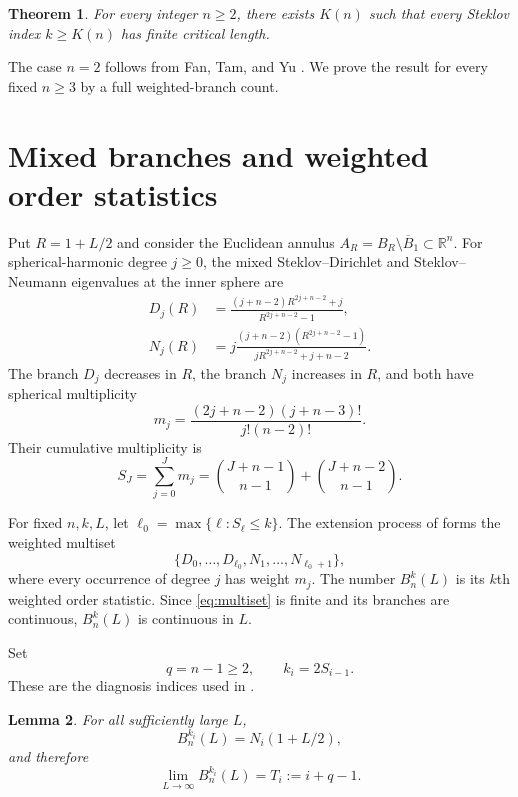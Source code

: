 \documentclass[11pt]{article}
\newtheorem{theorem}{Theorem}
\newtheorem{lemma}[theorem]{Lemma}
\theoremstyle{remark}
\begin{document}
\begin{theorem}\label{thm:main}
For every integer $n\ge2$, there exists $K(n)$ such that every Steklov
index $k\ge K(n)$ has finite critical length.
\end{theorem}

The case $n=2$ follows from Fan, Tam, and Yu \cite{FanTamYu}.  We prove the
result for every fixed $n\ge3$ by a full weighted-branch count.

\section{Mixed branches and weighted order statistics}

Put $R=1+L/2$ and consider the Euclidean annulus
$A_R=B_R\setminus\overline B_1\subset\mathbb R^n$.  For spherical-harmonic
degree $j\ge0$, the mixed Steklov--Dirichlet and Steklov--Neumann eigenvalues
at the inner sphere are
\begin{align}
 D_j(R)&=
 \frac{(j+n-2)R^{2j+n-2}+j}{R^{2j+n-2}-1},\label{eq:D}\\
 N_j(R)&=
 j\frac{(j+n-2)(R^{2j+n-2}-1)}
 {jR^{2j+n-2}+j+n-2}.\label{eq:N}
\end{align}
The branch $D_j$ decreases in $R$, the branch $N_j$ increases in $R$, and
both have spherical multiplicity
\begin{equation}\label{eq:multiplicity}
 m_j=\frac{(2j+n-2)(j+n-3)!}{j!(n-2)!}.
\end{equation}
Their cumulative multiplicity is
\begin{equation}\label{eq:S}
 S_J=\sum_{j=0}^Jm_j
 =\binom{J+n-1}{n-1}+\binom{J+n-2}{n-1}.
\end{equation}

For fixed $n,k,L$, let $\ell_0=\max\{\ell:S_\ell\le k\}$.  The extension
process of \cite{MetrasTschanz} forms the weighted multiset
\begin{equation}\label{eq:multiset}
 \{D_0,\ldots,D_{\ell_0},N_1,\ldots,N_{\ell_0+1}\},
\end{equation}
where every occurrence of degree $j$ has weight $m_j$.  The number
$B_n^k(L)$ is its $k$th weighted order statistic.  Since
\eqref{eq:multiset} is finite and its branches are continuous,
$B_n^k(L)$ is continuous in $L$.

Set
\[
 q=n-1\ge2,
 \qquad
 k_i=2S_{i-1}.
\]
These are the diagnosis indices used in \cite{MetrasTschanz}.

\begin{lemma}\label{lem:infinity}
For all sufficiently large $L$,
\[
 B_n^{k_i}(L)=N_i(1+L/2),
\]
and therefore
\begin{equation}\label{eq:Ti}
 \lim_{L\to\infty}B_n^{k_i}(L)=T_i:=i+q-1.
\end{equation}
\end{lemma}
\end{document}
